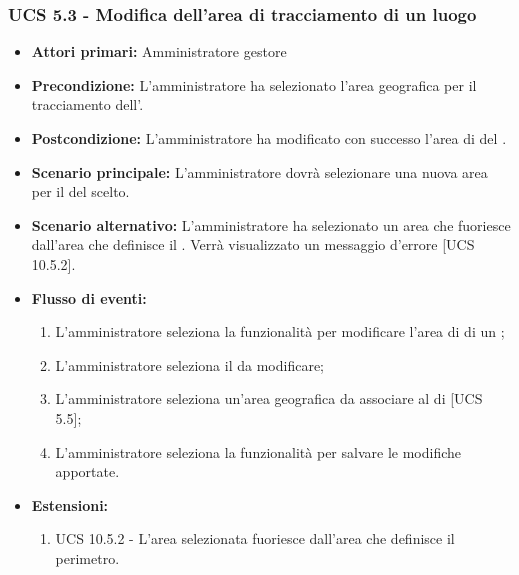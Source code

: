 \subsubsection{UCS 5.3 - Modifica dell'area di tracciamento di un luogo}%
\begin{itemize}
    \item \textbf{Attori primari:} Amministratore gestore
    \item \textbf{Precondizione:} L'amministratore ha selezionato l’area geografica per il tracciamento dell'.
    \item \textbf{Postcondizione:} L'amministratore ha modificato con successo l'area di  del .
    \item \textbf{Scenario principale:} L'amministratore dovrà selezionare una nuova area per il  del  scelto.
    \item \textbf{Scenario alternativo:} L'amministratore ha selezionato un area che fuoriesce dall'area che definisce il . Verrà visualizzato un messaggio d'errore [UCS 10.5.2].
    \item \textbf{Flusso di eventi:}
    \begin{enumerate}%
        \item L'amministratore seleziona la funzionalità per modificare l'area di  di un ;
        \item L'amministratore seleziona il  da modificare;
        \item L'amministratore seleziona un'area geografica da associare al  di  [UCS 5.5];
        \item L'amministratore seleziona la funzionalità per salvare le modifiche apportate.
    \end{enumerate}
    \item \textbf{Estensioni:}
    \begin{enumerate}
        \item UCS 10.5.2 - L'area selezionata fuoriesce dall'area che definisce il perimetro.
    \end{enumerate}
\end{itemize}

